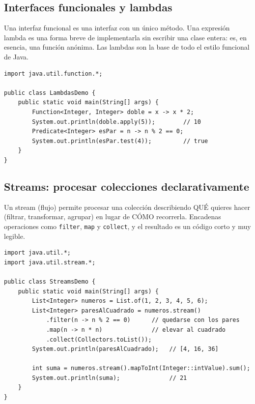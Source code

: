 \documentclass[11pt]{article}
\begin{document}
\subsection{Interfaces funcionales y lambdas}
Una interfaz funcional es una interfaz con un único método. Una expresión lambda es una forma breve de implementarla sin escribir una clase entera: es, en esencia, una función anónima. Las lambdas son la base de todo el estilo funcional de Java.

\begin{cajacodigo}
\begin{lstlisting}[style=java]
import java.util.function.*;

public class LambdasDemo {
    public static void main(String[] args) {
        Function<Integer, Integer> doble = x -> x * 2;
        System.out.println(doble.apply(5));        // 10
        Predicate<Integer> esPar = n -> n % 2 == 0;
        System.out.println(esPar.test(4));         // true
    }
}
\end{lstlisting}
\end{cajacodigo}
\vspace{2pt}
\subsection{Streams: procesar colecciones declarativamente}
Un stream (flujo) permite procesar una colección describiendo QUÉ quieres hacer (filtrar, transformar, agrupar) en lugar de CÓMO recorrerla. Encadenas operaciones como \texttt{filter}, \texttt{map} y \texttt{collect}, y el resultado es un código corto y muy legible.

\begin{cajacodigo}
\begin{lstlisting}[style=java]
import java.util.*;
import java.util.stream.*;

public class StreamsDemo {
    public static void main(String[] args) {
        List<Integer> numeros = List.of(1, 2, 3, 4, 5, 6);
        List<Integer> paresAlCuadrado = numeros.stream()
            .filter(n -> n % 2 == 0)      // quedarse con los pares
            .map(n -> n * n)              // elevar al cuadrado
            .collect(Collectors.toList());
        System.out.println(paresAlCuadrado);   // [4, 16, 36]

        int suma = numeros.stream().mapToInt(Integer::intValue).sum();
        System.out.println(suma);              // 21
    }
}
\end{lstlisting}
\end{cajacodigo}
\vspace{2pt}
\end{document}

